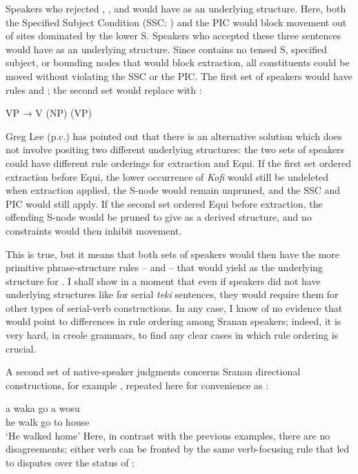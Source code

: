 \z

Speakers who rejected , , and  would have  as an underlying structure. Here, both the Specified Subject Condition (SSC: \citealt{Chomsky1973}) and the PIC would block movement out of sites dominated by the lower S. Speakers who accepted these three sentences would have  as an underlying structure. Since  contains no tensed S, specified subject, or bounding nodes that would block extraction, all constituents could be moved without violating the SSC or the PIC. The first set of speakers would have rules  and ; the second set would replace  with :

\ea\label{ex:2:248}
VP → V (NP) (VP)
\z

Greg Lee (p.c.) has pointed out that there is an alternative solution which does not involve positing two different underlying structures: the two sets of speakers could have different rule orderings for extraction and Equi. If the first set ordered extraction before Equi, the lower occurrence of \textit{Kofi} would still be undeleted when extraction applied, the S-node would remain unpruned, and the SSC and PIC would still apply. If the second set ordered Equi before ex\-traction, the offending S-node would be pruned to give  as a derived structure, and no constraints would then inhibit movement.

This is true, but it means that both sets of speakers would then have the more primitive phrase-structure rules --  and  -- that
would yield  as the underlying structure for . I shall show in a moment that even if speakers did not have underlying structures like  for serial \textit{teki} sentences, they would require them for other types of serial-verb constructions. In any case, I know of no evidence that would point to differences in rule ordering among Sranan speakers; indeed, it is very hard, in creole grammars, to find any clear cases in which rule ordering is crucial.

A second set of native-speaker judgments concerns Sranan directional constructions, for example , repeated here for conveni\-ence as :

\ea\label{ex:2:249}
\gll a waka go a wosu\\
he walk go to house \\
\glt `He walked home'
\z
Here, in contrast with the previous examples, there are no disagreements; either verb can be fronted by the same verb-focusing rule that led to disputes over the status of ;

